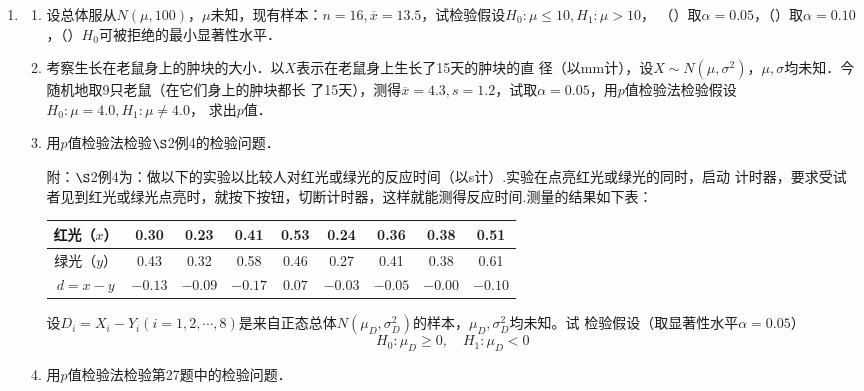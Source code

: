 \documentclass[10pt,a4paper]{article}
\begin{document}
\begin{enumerate}
    \item \begin{enumerate}
        \item 设总体服从$N(\mu, 100)$，$\mu$未知，现有样本：$n=16,\overline{x}=13.5$，试检验假设$H_0:\mu\leq 10,H_1:\mu>10$，
        （）取$\alpha=0.05$，（）取$\alpha=0.10$，（）$H_0$可被拒绝的最小显著性水平．
        \item 考察生长在老鼠身上的肿块的大小．以$X$表示在老鼠身上生长了15天的肿块的直
        径（以mm计），设$X\sim N(\mu,\sigma^2)$，$\mu,\sigma$均未知．今随机地取9只老鼠（在它们身上的肿块都长
        了15天），测得$\overline{x}=4.3,s=1.2$，试取$\alpha=0.05$，用$p$值检验法检验假设$H_0:\mu=4.0,H_1:\mu\neq 4.0$，
        求出$p$值．
        \item 用$p$值检验法检验$\S$2例4的检验问题．
        
        {\kaishu 附：$\S$2例4为：做以下的实验以比较人对红光或绿光的反应时间（以s计）.实验在点亮红光或绿光的同时，启动
        计时器，要求受试者见到红光或绿光点亮时，就按下按钮，切断计时器，这样就能测得反应时间.测量的结果如下表：
        \renewcommand{\arraystretch}{1.3}
        \begin{table}[H]
        \centering
            \begin{tabular}{c|cccccccc}
            红光（$x$） & 0.30    & 0.23    & 0.41    & 0.53   & 0.24    & 0.36    & 0.38    & 0.51    \\ \hline
            绿光（$y$） & 0.43    & 0.32    & 0.58    & 0.46   & 0.27    & 0.41    & 0.38    & 0.61    \\ \hline
            $d=x-y$ & $-0.13$ & $-0.09$ & $-0.17$ & $0.07$ & $-0.03$ & $-0.05$ & $-0.00$ & $-0.10$
            \end{tabular}
            \end{table}
        \renewcommand{\arraystretch}{1.0}
        设$D_i=X_i-Y_i(i=1,2,\cdots,8)$是来自正态总体$N(\mu_D,\sigma^2_D)$的样本，$\mu_D,\sigma^2_D$均未知。试
        检验假设（取显著性水平$\alpha=0.05$）
        $$H_0:\mu_D\geq 0,\quad H_1:\mu_D<0$$}
        \item 用$p$值检验法检验第27题中的检验问题．
        

\end{enumerate}
\end{enumerate}
\end{document}
